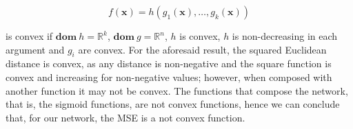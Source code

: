 \begin{itemize}
                \begin{equation*}
                    f(\mathbf{x}) = h(g_1(\mathbf{x}), \ldots, g_k(\mathbf{x}))
                \end{equation*}

                is convex if $\mathbf{dom} \ h = \mathbb{R}^k$, $\mathbf{dom} \ g = \mathbb{R}^n$, $h$ is convex,
                $h$ is non-decreasing in each argument and $g_i$ are convex. For the aforesaid result, the squared
                Euclidean distance is convex, as any distance is non-negative and the square function is convex and
                increasing for non-negative values; however, when composed with another function it may not be
                convex. The functions that compose the network, that is, the sigmoid functions, are not convex
                functions, hence we can conclude that, for our network, the MSE is a not convex function.
            \end{itemize}



